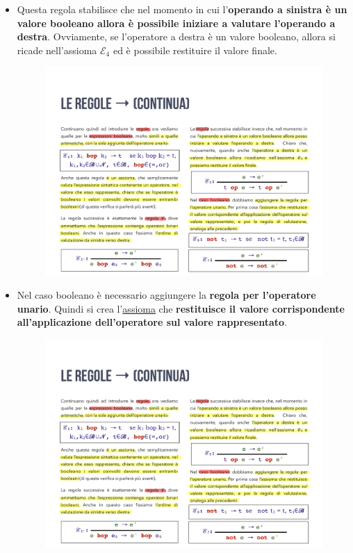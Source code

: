 \documentclass[a4paper]{article}
\begin{document}
\begin{itemize}
		\item Questa regola stabilisce che nel momento in cui l'\textbf{operando a sinistra è un valore booleano allora è possibile iniziare a valutare l'operando a destra}. Ovviamente, se l'operatore a destra è un valore booleano, allora si ricade nell'assioma $\mathcal{E}_{4}$ ed è possibile restituire il valore finale.
		\begin{figure}[!htp]
			\centering
			\includegraphics[width=.65\textwidth]{img/regola_transizione-5.pdf}
		\end{figure}
		
		\item Nel caso booleano è necessario aggiungere la \textbf{regola per l'operatore unario}. Quindi si crea l'\underline{assioma} che \textbf{restituisce il valore corrispondente all'applicazione dell'operatore sul valore rappresentato}.
		\begin{figure}[!htp]
			\centering
			\includegraphics[width=.65\textwidth]{img/regola_transizione-6.pdf}
		\end{figure}
		

\end{itemize}
\end{document}
